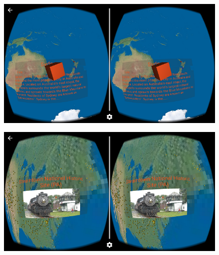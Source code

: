 \begin{figure}[H]
	\centering
	\includegraphics[width=\textwidth, keepaspectratio]{Figures/Screenshots/placemark-obj-2.png}
	\decoRule
\end{figure}

\begin{figure}[H]
	\centering
	\includegraphics[width=\textwidth, keepaspectratio]{Figures/Screenshots/placemark-image.png}
	\decoRule
\end{figure}


